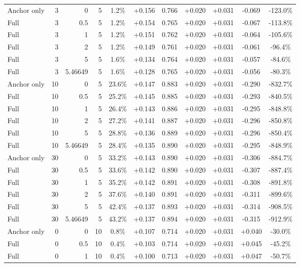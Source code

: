 \begin{table}[htbp]
\begin{tabular}{lrrrccccccc}
Anchor only & 3 & 0 & 5 & 1.2\% & +0.156 & 0.766 & +0.020 & +0.031 & -0.069 & -123.0\% \\
Full & 3 & 0.5 & 5 & 1.2\% & +0.154 & 0.765 & +0.020 & +0.031 & -0.067 & -113.8\% \\
Full & 3 & 1 & 5 & 1.2\% & +0.151 & 0.762 & +0.020 & +0.031 & -0.064 & -105.6\% \\
Full & 3 & 2 & 5 & 1.2\% & +0.149 & 0.761 & +0.020 & +0.031 & -0.061 & -96.4\% \\
Full & 3 & 5 & 5 & 1.6\% & +0.134 & 0.764 & +0.020 & +0.031 & -0.057 & -84.6\% \\
Full & 3 & 5.46649 & 5 & 1.6\% & +0.128 & 0.765 & +0.020 & +0.031 & -0.056 & -80.3\% \\
Anchor only & 10 & 0 & 5 & 23.6\% & +0.147 & 0.883 & +0.020 & +0.031 & -0.290 & -832.7\% \\
Full & 10 & 0.5 & 5 & 25.2\% & +0.145 & 0.885 & +0.020 & +0.031 & -0.293 & -840.5\% \\
Full & 10 & 1 & 5 & 26.4\% & +0.143 & 0.886 & +0.020 & +0.031 & -0.295 & -848.8\% \\
Full & 10 & 2 & 5 & 27.2\% & +0.141 & 0.887 & +0.020 & +0.031 & -0.296 & -850.8\% \\
Full & 10 & 5 & 5 & 28.8\% & +0.136 & 0.889 & +0.020 & +0.031 & -0.296 & -850.4\% \\
Full & 10 & 5.46649 & 5 & 28.4\% & +0.135 & 0.890 & +0.020 & +0.031 & -0.295 & -848.9\% \\
Anchor only & 30 & 0 & 5 & 33.2\% & +0.143 & 0.890 & +0.020 & +0.031 & -0.306 & -884.7\% \\
Full & 30 & 0.5 & 5 & 33.6\% & +0.142 & 0.890 & +0.020 & +0.031 & -0.307 & -887.4\% \\
Full & 30 & 1 & 5 & 35.2\% & +0.142 & 0.891 & +0.020 & +0.031 & -0.308 & -891.8\% \\
Full & 30 & 2 & 5 & 37.6\% & +0.140 & 0.891 & +0.020 & +0.031 & -0.311 & -899.6\% \\
Full & 30 & 5 & 5 & 42.4\% & +0.137 & 0.893 & +0.020 & +0.031 & -0.314 & -908.5\% \\
Full & 30 & 5.46649 & 5 & 43.2\% & +0.137 & 0.894 & +0.020 & +0.031 & -0.315 & -912.9\% \\
Anchor only & 0 & 0 & 10 & 0.8\% & +0.107 & 0.714 & +0.020 & +0.031 & +0.040 & -30.0\% \\
Full & 0 & 0.5 & 10 & 0.4\% & +0.103 & 0.714 & +0.020 & +0.031 & +0.045 & -45.2\% \\
Full & 0 & 1 & 10 & 0.4\% & +0.100 & 0.713 & +0.020 & +0.031 & +0.047 & -50.7\% \\

\end{tabular}
\end{table}
